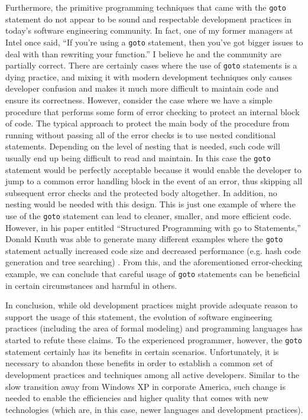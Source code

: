 \documentclass[12pt,letterpaper]{article}
\begin{document}
Furthermore, the primitive programming techniques that came with the {\tt goto} statement do not
appear to be sound and respectable development practices in today's software 
engineering community. In fact, one of my former managers at Intel once said, ``If you're using a 
{\tt goto} statement, then you've got bigger issues to deal with than rewriting your function.'' 
I believe he and the community are partially correct. There are certainly cases where the use of 
{\tt goto} statements is a dying practice, and mixing it with modern development techniques only causes developer confusion and makes it much more difficult to maintain code and ensure its correctness. 
However, consider the case where we have a simple procedure that performs some form of error checking to protect an internal block of code.
The typical approach to protect the main body of the procedure from running without passing all of the error checks is to use nested conditional statements. Depending on the level of nesting that is needed, such code will usually
end up being difficult to read and maintain. In this case the {\tt goto} statement would be perfectly acceptable
because it would enable the developer to jump to a common error handling block in the event of 
an error, thus skipping all subsequent error checks and the protected body altogether. In addition, no 
nesting would be needed with this design. This is just one example of where the use of the 
{\tt goto} statement can lead to cleaner, smaller, and more efficient code. However, in his 
paper entitled ``Structured Programming with go to Statements,'' Donald 
Knuth was able to generate many different examples where the {\tt goto} statement actually increased code 
size and decreased performance (e.g. hash code generation and tree searching) \cite{Knuth1974}. From this, and the aforementioned error-checking 
example, we can conclude that careful usage of {\tt goto} statements can be beneficial in certain
circumstances and harmful in others. 

In conclusion, while old development practices might provide adequate reason to support the usage of
this statement, the evolution of software engineering practices (including the area of formal modeling) 
and programming languages has started to refute these claims. To the experienced programmer, however, the {\tt goto} statement
certainly has its benefits in certain scenarios. Unfortunately, it is necessary to abandon these benefits in order
to establish a common set of development practices and techniques among all active developers. 
Similar to the slow transition away from Windows XP in corporate America, such change
is needed to enable the efficiencies and higher quality that comes with new technologies (which are, in this case,
newer languages and development practices).





\end{document}
